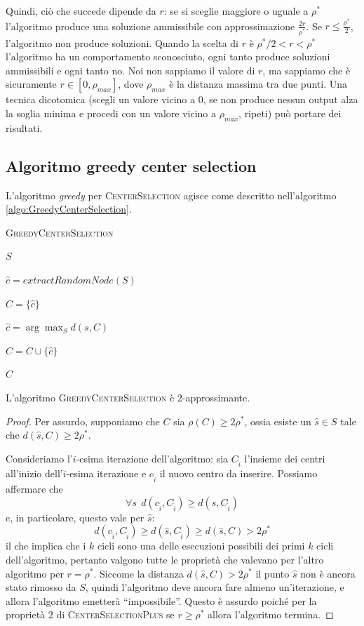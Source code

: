 Quindi, ciò che succede dipende da $r$: se si sceglie maggiore o uguale a $\rho^*$
l'algoritmo produce una soluzione ammissibile con approssimazione $\frac{2r}{\rho^*}$.
Se $r \leq \frac{\rho^*}{2}$, l'algoritmo non produce soluzioni. Quando la scelta di
$r$ è $ \rho^*/2 < r < \rho^*$ l'algoritmo ha un comportamento sconosciuto,
ogni tanto produce soluzioni ammissibili e ogni tanto no. Noi non sappiamo il valore
di $r$, ma sappiamo che è sicuramente $r \in [0, \rho_{max}]$, dove $\rho_{max}$
è la distanza massima tra due punti. Una tecnica dicotomica (scegli un valore vicino a $0$,
se non produce nessun output alza la soglia minima e procedi con un valore vicino a $\rho_{max}$,
ripeti) può portare dei risultati.

\subsection{Algoritmo greedy center selection}
L'algoritmo \textit{greedy} per \textsc{CenterSelection} agisce come descritto
nell'algoritmo \ref{algo:GreedyCenterSelection}.
\begin{algorithm}[h]
	\caption{\textsc{GreedyCenterSelection}}
	\label{algo:GreedyCenterSelection}

	{
		\Return $S$
	}

	$\hat{c} = extractRandomNode(S)$

	$C = \{\hat{c}\}$

	{
		$\hat{c} = \arg \max_{S} d(s, C)$

		$C = C \cup \{\hat{c}\}$
	}
	\Return $C$
\end{algorithm}

\begin{theorem}
	L'algoritmo \textsc{GreedyCenterSelection} è $2$-approssimante.
\end{theorem}
\begin{proof}
	Per assurdo, supponiamo che $C$ sia $\rho(C) \geq 2\rho^*$, ossia
	esiste un $\hat{s} \in S$ tale che $d(\hat{s}, C) \geq 2\rho^*$.

	Consideriamo l'$i$-esima iterazione dell'algoritmo: sia $C_{\hat{i}}$ l'insieme
	dei centri all'inizio dell'$i$-esima iterazione e $c_{\hat{i}}$ il nuovo centro
	da inserire. Possiamo affermare che
	$$
		\forall s ~~ d(c_{\hat{i}}, C_{\hat{i}}) \geq d(s, C_{\hat{i}})
	$$
	e, in particolare, questo vale per $\hat{s}$:
	$$
		d(c_{\hat{i}}, C_{\hat{i}}) \geq d(\hat{s}, C_{\hat{i}}) \geq d(\hat{s}, C) > 2\rho^*
	$$
	il che implica che i $k$ cicli sono una delle esecuzioni possibili dei primi
	$k$ cicli dell'algoritmo, pertanto valgono tutte le proprietà che valevano
	per l'altro algoritmo per $r = \rho^*$. Siccome la distanza $d(\hat{s}, C) > 2\rho^*$
	il punto $\hat{s}$ non è ancora stato rimosso da $S$, quindi l'algoritmo deve
	ancora fare almeno un'iterazione, e allora l'algoritmo emetterà ``impossibile''.
	Questo è assurdo poiché per la proprietà $2$ di \textsc{CenterSelectionPlus}
	se $r \geq \rho^*$  allora l'algoritmo termina.
\end{proof}

